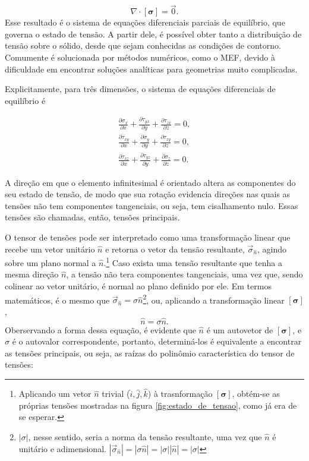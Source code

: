 \begin{equation}
    \nabla \cdot [\bm{\sigma}] = \vec{0}.
\end{equation}
Esse resultado é o sistema de equações diferenciais parciais de equilíbrio, que governa o estado de tensão. A partir dele, é possível obter tanto a distribuição de tensão sobre o sólido, desde que sejam conhecidas as condições de contorno. Comumente é solucionada por métodos numéricos, como o MEF, devido à dificuldade em encontrar soluções analíticas para geometrias muito complicadas. 

Explicitamente, para três dimensões, o sistema de equações diferenciais de equilíbrio é

\begin{gather}
       \displaystyle \frac{\partial \sigma_x}{\partial x} + \frac{\partial \tau_{yx}}{\partial y} + \frac{\partial \tau_{zx}}{\partial z} = 0, \\
       \displaystyle \frac{\partial \tau_{xy}}{\partial x} + \frac{\partial \sigma_y}{\partial y} + \frac{\partial \tau_{zy}}{\partial z} = 0, \\
       \displaystyle \frac{\partial \tau_{xz}}{\partial x} + \frac{\partial \tau_{yz}}{\partial y} + \frac{\partial \sigma_z}{\partial z} = 0.
       \label{eq:equilibrio_governo}
\end{gather}


A direção em que o elemento infinitesimal é orientado altera as componentes do seu estado de tensão, de modo que sua rotação evidencia direções nas quais as tensões não tem componentes tangenciais, ou seja, tem cisalhamento nulo. Essas tensões são chamadas, então, tensões principais.

O tensor de tensões pode ser interpretado como uma transformação linear que recebe um vetor unitário $\hat{n}$ e retorna o vetor da tensão resultante, $\vec{\sigma}_{\hat{n}}$, agindo sobre um plano normal a $\hat{n}$.\footnote{Aplicando um vetor $\hat{n}$ trivial ($\hat{i}, \hat{j}, \hat{k}$) à trasnformação $[\bm{\sigma}]$, obtém-se as próprias tensões mostradas na figura \ref{fig:estado_de_tensao}, como já era de se esperar.} Caso exista uma tensão resultante que tenha a mesma direção $\hat{n}$, a tensão não tera componentes tangenciais, uma vez que, sendo colinear ao vetor unitário, é normal ao plano definido por ele. Em termos matemáticos, é o mesmo que $\vec{\sigma}_{\hat{n}} = \sigma \hat{n}$\footnote{$|\sigma|$, nesse sentido, seria a norma da tensão resultante, uma vez que $\hat{n}$ é unitário e adimensional. $ |\vec{\sigma}_{\hat{n}}| = |\sigma \hat{n}| = |\sigma| |\hat{n}| = |\sigma| $}, ou, aplicando a transformação linear $[\bm{\sigma}]$,
\begin{equation}
    [\bm{\sigma}]\hat{n} = \sigma \hat{n}.
\end{equation}
Oberservando a forma dessa equação, é evidente que $\hat{n}$ é um autovetor de $[\bm{\sigma}]$, e $\sigma$ é o autovalor correspondente, portanto, determiná-los é equivalente a encontrar as tensões principais, ou seja, as raízas do polinômio característica do tensor de tensões:

